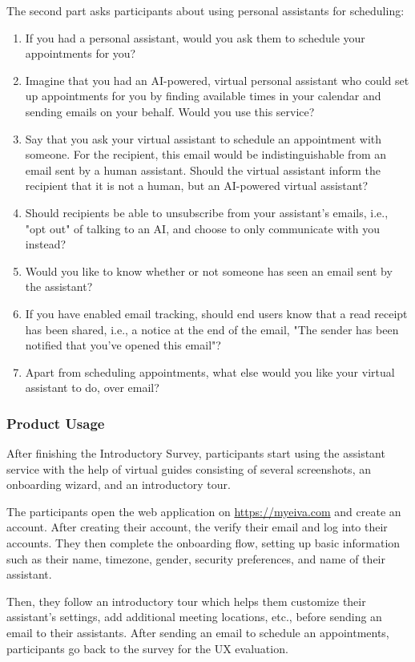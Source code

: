 \documentclass{article}
\begin{document}
The second part asks participants about using personal assistants for scheduling:

\begin{enumerate}[resume]
	\item If you had a personal assistant, would you ask them to schedule your appointments for you?
	\item Imagine that you had an AI-powered, virtual personal assistant who could set up appointments for you by finding available times in your calendar and sending emails on your behalf. Would you use this service?
	\item Say that you ask your virtual assistant to schedule an appointment with someone. For the recipient, this email would be indistinguishable from an email sent by a human assistant. Should the virtual assistant inform the recipient that it is not a human, but an AI-powered virtual assistant?
	\item Should recipients be able to unsubscribe from your assistant's emails, i.e., "opt out" of talking to an AI, and choose to only communicate with you instead?
	\item Would you like to know whether or not someone has seen an email sent by the assistant?
	\item If you have enabled email tracking, should end users know that a read receipt has been shared, i.e., a notice at the end of the email, "The sender has been notified that you've opened this email"?
	\item Apart from scheduling appointments, what else would you like your virtual assistant to do, over email?
\end{enumerate}

\subsubsection{Product Usage}

After finishing the Introductory Survey, participants start using the assistant service with the help of virtual guides consisting of several screenshots, an onboarding wizard, and an introductory tour.

The participants open the web application on \url{https://myeiva.com} and create an account. After creating their account, the verify their email and log into their accounts. They then complete the onboarding flow, setting up basic information such as their name, timezone, gender, security preferences, and name of their assistant.

Then, they follow an introductory tour which helps them customize their assistant's settings, add additional meeting locations, etc., before sending an email to their assistants. After sending an email to schedule an appointments, participants go back to the survey for the UX evaluation.
\end{document}
